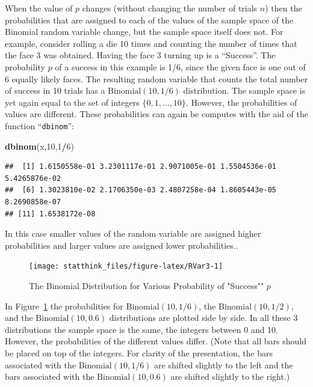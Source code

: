 \documentclass[]{krantz}
\makeatletter
\newenvironment{Shaded}{\begin{snugshade}}{\end{snugshade}}
\newcommand{\KeywordTok}[1]{\textcolor[rgb]{0.13,0.29,0.53}{\textbf{#1}}}
\newcommand{\DecValTok}[1]{\textcolor[rgb]{0.00,0.00,0.81}{#1}}
\newcommand{\OperatorTok}[1]{\textcolor[rgb]{0.81,0.36,0.00}{\textbf{#1}}}
\newcommand{\NormalTok}[1]{#1}
\newenvironment{kframe}{%
\medskip{}
\setlength{\fboxsep}{.8em}
 \def\at@end@of@kframe{}%
 \ifinner\ifhmode%
  \def\at@end@of@kframe{\end{minipage}}%
  \begin{minipage}{\columnwidth}%
 \fi\fi%
 \def\FrameCommand##1{\hskip\@totalleftmargin \hskip-\fboxsep
 \colorbox{shadecolor}{##1}\hskip-\fboxsep
     \hskip-\linewidth \hskip-\@totalleftmargin \hskip\columnwidth}%
 \MakeFramed {\advance\hsize-\width
   \@totalleftmargin\z@ \linewidth\hsize
   \@setminipage}}%
 {\par\unskip\endMakeFramed%
 \at@end@of@kframe}
\renewenvironment{Shaded}{\begin{kframe}}{\end{kframe}}
\theoremstyle{definition}
\theoremstyle{definition}
\theoremstyle{definition}
\theoremstyle{remark}
\makeatother
\begin{document}
When the value of \(p\) changes (without changing the number of trials
\(n\)) then the probabilities that are assigned to each of the values of
the sample space of the Binomial random variable change, but the sample
space itself does not. For example, consider rolling a die 10 times and
counting the number of times that the face 3 was obtained. Having the
face 3 turning up is a ``Success''. The probability \(p\) of a success
in this example is 1/6, since the given face is one out of 6 equally
likely faces. The resulting random variable that counts the total number
of success in 10 trials has a \(\mathrm{Binomial}(10,1/6)\)
distribution. The sample space is yet again equal to the set of integers
\(\{0,1, \ldots,10\}\). However, the probabilities of values are
different. These probabilities can again be computes with the aid of the
function ``\texttt{dbinom}'':

\begin{Shaded}
\begin{Highlighting}[]
\KeywordTok{dbinom}\NormalTok{(x,}\DecValTok{10}\NormalTok{,}\DecValTok{1}\OperatorTok{/}\DecValTok{6}\NormalTok{)}
\end{Highlighting}
\end{Shaded}

\begin{verbatim}
##  [1] 1.6150558e-01 3.2301117e-01 2.9071005e-01 1.5504536e-01 5.4265876e-02
##  [6] 1.3023810e-02 2.1706350e-03 2.4807258e-04 1.8605443e-05 8.2690858e-07
## [11] 1.6538172e-08
\end{verbatim}

In this case smaller values of the random variable are assigned higher
probabilities and larger values are assigned lower probabilities..

\begin{figure}

{\centering \texttt{[image: statthink\_files/figure-latex/RVar3-1]} 

}

\caption{The Binomial Distribution for Various Probability of "Success"" $p$}\label{fig:RVar3}
\end{figure}

In Figure~\ref{fig:RVar3} the probabilities for
\(\mathrm{Binomial}(10,1/6)\), the \(\mathrm{Binomial}(10,1/2)\), and
the \(\mathrm{Binomial}(10,0.6)\) distributions are plotted side by
side. In all these 3 distributions the sample space is the same, the
integers between 0 and 10. However, the probabilities of the different
values differ. (Note that all bars should be placed on top of the
integers. For clarity of the presentation, the bars associated with the
\(\mathrm{Binomial}(10,1/6)\) are shifted slightly to the left and the
bars associated with the \(\mathrm{Binomial}(10,0.6)\) are shifted
slightly to the right.)
\end{document}
